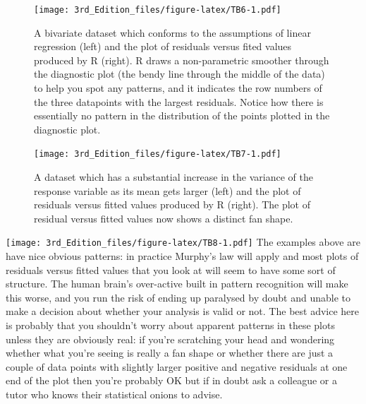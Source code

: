 \documentclass[
]{book}
\begin{document}
\begin{figure}
\centering
\texttt{[image: 3rd\_Edition\_files/figure-latex/TB6-1.pdf]}
\caption{\label{fig:TB6}A bivariate dataset which conforms to the assumptions of linear regression (left) and the plot of residuals versus fited values produced by R (right). R draws a non-parametric smoother through the diagnostic plot (the bendy line through the middle of the data) to help you spot any patterns, and it indicates the row numbers of the three datapoints with the largest residuals. Notice how there is essentially no pattern in the distribution of the points plotted in the diagnostic plot.}
\end{figure}

\begin{figure}
\centering
\texttt{[image: 3rd\_Edition\_files/figure-latex/TB7-1.pdf]}
\caption{\label{fig:TB7}A dataset which has a substantial increase in the variance of the response variable as its mean gets larger (left) and the plot of residuals versus fitted values produced by R (right). The plot of residual versus fitted values now shows a distinct fan shape.}
\end{figure}

\texttt{[image: 3rd\_Edition\_files/figure-latex/TB8-1.pdf]}
The examples above are have nice obvious patterns: in practice Murphy's law will apply and most plots of residuals versus fitted values that you look at will seem to have some sort of structure. The human brain's over-active built in pattern recognition will make this worse, and you run the risk of ending up paralysed by doubt and unable to make a decision about whether your analysis is valid or not. The best advice here is probably that you shouldn't worry about apparent patterns in these plots unless they are obviously real: if you're scratching your head and wondering whether what you're seeing is really a fan shape or whether there are just a couple of data points with slightly larger positive and negative residuals at one end of the plot then you're probably OK but if in doubt ask a colleague or a tutor who knows their statistical onions to advise.
\end{document}
